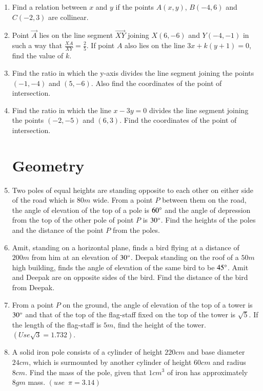 \documentclass[2pt,-letter paper]{article}
\providecommand{\brak}[1]{\ensuremath{\left(#1\right)}}
\begin{document}
\begin{enumerate}
\item Find a relation between $x$ and $y$ if the points $A\brak{x, y}$,  $B\brak{-4, 6} $ and $C\brak{-2, 3}$ are collinear.

\item Point $\Vec{A}$ lies on the line segment $\Vec{XY}$ joining $X\brak{6, - 6}$ and $Y\brak{-4,-1}$ in such a way that $\frac{XA}{XY}=\frac{2}{5}$. If point $A$ also lies on the line $3x + k \brak{y + 1}= 0$, find the value of $k$.

\item Find the ratio in which the y-axis divides the line segment joining the points $\brak{-1, -4}$ and $\brak{5, -6}$. Also find the coordinates of the point of intersection.

\item Find the ratio in which the line $x-3y = 0$ divides the line segment joining the points $\brak{ -2, -5}$ and $\brak{6, 3}$. Find the coordinates of the point of intersection.


\section{Geometry}

\item Two poles of equal heights are standing opposite to each other on either side of the road which is $80 m$ wide. From a point $P$ between them on the road, the angle of elevation of the top of a pole is $60\degree$ and the angle of depression from the top of the other pole of point $P$ is $30\degree$. Find the heights of the poles and the distance of the point $P$ from the poles.

\item Amit, standing on a horizontal plane, finds a bird flying at a distance of $200 m$ from him at an elevation of $30\degree$. Deepak standing on the roof of a $50 m$ high building, finds the angle of elevation of the same bird to be $45\degree$. Amit and Deepak are on opposite sides of the bird. Find the distance of the bird from Deepak.

\item From a point $P$ on the ground, the angle of elevation of the top of a tower is $30\degree$ and that of the top of the flag-staff fixed on the top of the tower is $\sqrt{5}$. If the length of the flag-staff is $5 m$, find the height of the tower. $(Use \sqrt{3}= 1.732)$.


\item A solid iron pole consists of a cylinder of height $220 cm$ and base diameter $24 cm$, which is surmounted by another cylinder of height $60 cm$ and radius $8 cm$. Find the mass of the pole, given that $1 cm^3$ of iron has approximately $8 gm$ mass. $(use\hspace{6pt} \pi =3.14)$


\end{enumerate}
\end{document}
